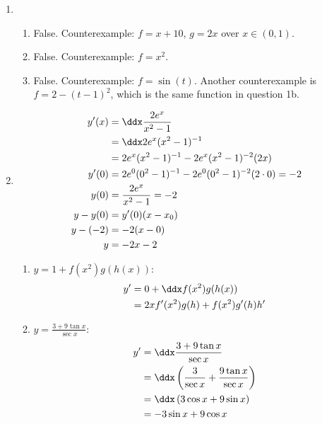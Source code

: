 \begin{enumerate}
\begin{enumerate}
	\end{enumerate}
    
    \item \begin{enumerate}
    
    	\item False. Counterexample: $f = x + 10$, $g = 2x$ over $x\in(0,1)$.
    
        \item False. Counterexample: $f = x^2$.
        
        \item False. Counterexample: $f = \sin(t)$. Another counterexample is $f=2 - (t-1)^2$, which is the same function in question 1b.
    
	\end{enumerate}
    
    \item \begin{align*}
    	y'(x) &= \ddx \frac{2e^x}{x^2-1} \\
        &= \ddx 2e^x(x^2-1)^{-1} \\
        &= 2e^x (x^2 -1)^{-1} - 2e^x (x^2 - 1)^{-2}(2x) \\
        y'(0) &= 2e^0 (0^2 -1)^{-1} - 2e^0 (0^2 - 1)^{-2}(2\cdot 0) = -2 \\
        y(0) &= \frac{2e^x}{x^2-1} = -2 \\
        y - y(0) &= y'(0)(x-x_0) \\
        y - (-2) &= -2(x-0) \\    
        y &= -2x -2
    \end{align*}
    
    
    \begin{enumerate}
    	\item $y = 1 + f(x^2) g(h(x))$: 
        \begin{align*}
        	y' 
            &= 0 + \ddx  f(x^2) g(h(x)) \\
            &= 2xf'(x^2) g(h) + f(x^2)g'(h)h'
        \end{align*}
        \item $y = \frac{3+9\tan x}{\sec x}$:
        \begin{align*}
        	y' 
            &= \ddx \frac{3+9\tan x}{\sec x} \\
            &= \ddx \left(\frac{3}{\sec x} + \frac{9\tan x}{\sec x} \right)\\
            &= \ddx \left( 3\cos x + 9\sin x \right)\\
            &= -3\sin x + 9\cos x 
        \end{align*}        
    \end{enumerate}    
\end{enumerate}